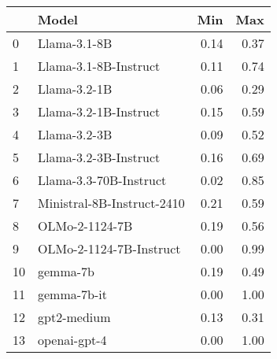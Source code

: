 \begin{tabular}{llrr}
\toprule
 & Model & Min & Max \\
\midrule
0 & Llama-3.1-8B & 0.14 & 0.37 \\
1 & Llama-3.1-8B-Instruct & 0.11 & 0.74 \\
2 & Llama-3.2-1B & 0.06 & 0.29 \\
3 & Llama-3.2-1B-Instruct & 0.15 & 0.59 \\
4 & Llama-3.2-3B & 0.09 & 0.52 \\
5 & Llama-3.2-3B-Instruct & 0.16 & 0.69 \\
6 & Llama-3.3-70B-Instruct & 0.02 & 0.85 \\
7 & Ministral-8B-Instruct-2410 & 0.21 & 0.59 \\
8 & OLMo-2-1124-7B & 0.19 & 0.56 \\
9 & OLMo-2-1124-7B-Instruct & 0.00 & 0.99 \\
10 & gemma-7b & 0.19 & 0.49 \\
11 & gemma-7b-it & 0.00 & 1.00 \\
12 & gpt2-medium & 0.13 & 0.31 \\
13 & openai-gpt-4 & 0.00 & 1.00 \\
\bottomrule
\end{tabular}
